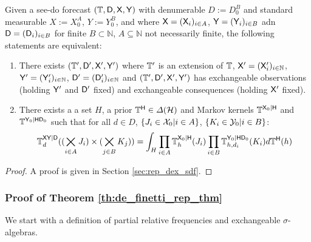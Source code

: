 \begin{theorem}\label{th:rep_dex_sdf}
Given a see-do forecast $(\mathbb{T},\mathsf{D},\mathsf{X},\mathsf{Y})$ with denumerable $D:=D_0^B$ and standard measurable $X:=X_0^A$, $Y:=Y_0^B$, and where $\mathsf{X}=(\mathsf{X}_i)_{i\in A}$, $\mathsf{Y}=(\mathsf{Y}_i)_{i\in B}$ adn $\mathsf{D}=(\mathsf{D}_i)_{i\in B}$ for finite $B\subset \mathbb{N}$, $A\subseteq \mathbb{N}$ not necessarily finite, the following statements are equivalent:

\begin{enumerate}
    \item There exists $(\mathbb{T}',\mathsf{D}',\mathsf{X}',\mathsf{Y}')$ where $\mathbb{T}'$ is an extension of $\mathbb{T}$, $\mathsf{X}'=(\mathsf{X}'_i)_{i\in \mathbb{N}}$, $\mathsf{Y}'=(\mathsf{Y}'_i)_{i\in \mathbb{N}}$, $\mathsf{D}'=(\mathsf{D}'_i)_{i\in\mathbb{N}}$ and $(\mathbb{T}',\mathsf{D}',\mathsf{X}',\mathsf{Y}')$ has exchangeable observations (holding $\mathsf{Y}'$ and $\mathsf{D}'$ fixed) and exchangeable consequences (holding $\mathsf{X}'$ fixed).
    \item There exists a a set $H$, a prior $\mathbb{T}^{\mathsf{H}}\in\Delta(\mathcal{H})$ and Markov kernels $\mathbb{T}^{\mathsf{X}_0|\mathsf{H}}$ and $\mathbb{T}^{\mathsf{Y}_0|\mathsf{H}\mathsf{D}_0}$ such that for all $d\in D$, $\{J_i\in \mathcal{X}_0|i\in A\}$, $\{K_i\in \mathcal{Y}_0|i\in B\}$:
    \begin{align}
        \mathbb{T}^{\mathsf{X}\mathsf{Y}|\mathsf{D}}_{d}((\bigtimes_{i\in A}J_i)\times (\bigtimes_{j\in B} K_j)) = \int_{H} \prod_{i\in A} \mathbb{T}^{\mathsf{X}_0|\mathsf{H}}_h(J_i)\prod_{i\in B}\mathbb{T}_{h,d_i}^{\mathsf{Y}_0|\mathsf{H}\mathsf{D}_0}(K_i)d\mathbb{T}^{\mathsf{H}}(h)
    \end{align}
\end{enumerate}
\end{theorem}

\begin{proof}
A proof is given in Section \ref{sec:rep_dex_sdf}.
\end{proof}

\subsubsection{Proof of Theorem \ref{th:de_finetti_rep_thm}}\label{sec:de_finetti_rep_thm}

We start with a definition of partial relative frequencies and exchangeable $\sigma$-algebras.

